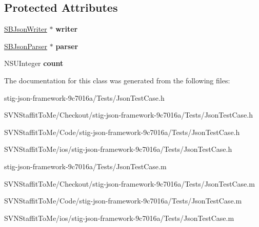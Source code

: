 \subsection*{\-Protected \-Attributes}
\begin{DoxyCompactItemize}
\item 
\hypertarget{interface_json_test_case_a0a006d6ffe87ffd4b4cee687ac6e2261}{
\hyperlink{interface_s_b_json_writer}{\-S\-B\-Json\-Writer} $\ast$ {\bfseries writer}}
\label{interface_json_test_case_a0a006d6ffe87ffd4b4cee687ac6e2261}

\item 
\hypertarget{interface_json_test_case_a9d8721080187315c01a45fe139de64ac}{
\hyperlink{interface_s_b_json_parser}{\-S\-B\-Json\-Parser} $\ast$ {\bfseries parser}}
\label{interface_json_test_case_a9d8721080187315c01a45fe139de64ac}

\item 
\hypertarget{interface_json_test_case_aa08c9380289acd56a5be06b495d67127}{
\-N\-S\-U\-Integer {\bfseries count}}
\label{interface_json_test_case_aa08c9380289acd56a5be06b495d67127}

\end{DoxyCompactItemize}


\-The documentation for this class was generated from the following files\-:\begin{DoxyCompactItemize}
\item 
stig-\/json-\/framework-\/9c7016a/\-Tests/\-Json\-Test\-Case.\-h\item 
\-S\-V\-N\-Staffit\-To\-Me/\-Checkout/stig-\/json-\/framework-\/9c7016a/\-Tests/\-Json\-Test\-Case.\-h\item 
\-S\-V\-N\-Staffit\-To\-Me/\-Code/stig-\/json-\/framework-\/9c7016a/\-Tests/\-Json\-Test\-Case.\-h\item 
\-S\-V\-N\-Staffit\-To\-Me/ios/stig-\/json-\/framework-\/9c7016a/\-Tests/\-Json\-Test\-Case.\-h\item 
stig-\/json-\/framework-\/9c7016a/\-Tests/\-Json\-Test\-Case.\-m\item 
\-S\-V\-N\-Staffit\-To\-Me/\-Checkout/stig-\/json-\/framework-\/9c7016a/\-Tests/\-Json\-Test\-Case.\-m\item 
\-S\-V\-N\-Staffit\-To\-Me/\-Code/stig-\/json-\/framework-\/9c7016a/\-Tests/\-Json\-Test\-Case.\-m\item 
\-S\-V\-N\-Staffit\-To\-Me/ios/stig-\/json-\/framework-\/9c7016a/\-Tests/\-Json\-Test\-Case.\-m\end{DoxyCompactItemize}
